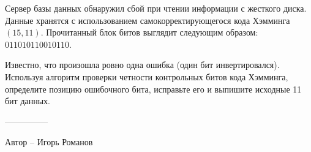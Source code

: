 \question
Сервер базы данных обнаружил сбой при чтении информации с жесткого диска. Данные хранятся с использованием самокорректирующегося кода Хэмминга $(15,11)$. Прочитанный блок битов выглядит следующим образом: $011010110010110$.

Известно, что произошла ровно одна ошибка (один бит инвертировался). Используя алгоритм проверки четности контрольных битов кода Хэмминга, определите позицию ошибочного бита, исправьте его и выпишите исходные 11 бит данных.

---------------

Автор -- Игорь Романов
